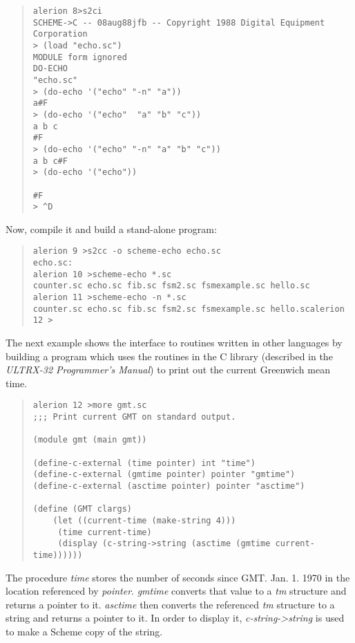 \documentclass[11pt]{article}
\begin{document}
\begin{small}
\begin{quote}
\begin{verbatim}
alerion 8>s2ci
SCHEME->C -- 08aug88jfb -- Copyright 1988 Digital Equipment Corporation
> (load "echo.sc")
MODULE form ignored
DO-ECHO
"echo.sc"
> (do-echo '("echo" "-n" "a"))
a#F
> (do-echo '("echo"  "a" "b" "c"))
a b c
#F
> (do-echo '("echo" "-n" "a" "b" "c"))
a b c#F
> (do-echo '("echo"))

#F
> ^D
\end{verbatim}
\end{quote}
\end{small}

Now, compile it and build a stand-alone program:

\begin{small}
\begin{quote}
\begin{verbatim}
alerion 9 >s2cc -o scheme-echo echo.sc
echo.sc:
alerion 10 >scheme-echo *.sc
counter.sc echo.sc fib.sc fsm2.sc fsmexample.sc hello.sc
alerion 11 >scheme-echo -n *.sc
counter.sc echo.sc fib.sc fsm2.sc fsmexample.sc hello.scalerion 12 >
\end{verbatim}
\end{quote}
\end{small}

The next example shows the interface to routines written in other
languages by building a program which uses the routines in the C library 
(described in the \emph{ULTRX-32 Programmer's Manual}) to print out the
current Greenwich mean time.

\begin{small}
\begin{quote}
\begin{verbatim}
alerion 12 >more gmt.sc
;;; Print current GMT on standard output.

(module gmt (main gmt))

(define-c-external (time pointer) int "time")
(define-c-external (gmtime pointer) pointer "gmtime")
(define-c-external (asctime pointer) pointer "asctime")

(define (GMT clargs)
    (let ((current-time (make-string 4)))
	 (time current-time)
	 (display (c-string->string (asctime (gmtime current-time))))))
\end{verbatim}
\end{quote}
\end{small}

The procedure \emph{time} stores the number of seconds since GMT. Jan.
1. 1970 in the location referenced by \emph{pointer}. \emph{gmtime}
converts that value to a \emph{tm} structure and returns a pointer to
it. \emph{asctime} then converts the referenced \emph{tm} structure to a
string and returns a pointer to it.  In order to display it,
\emph{c-string->string} is used to make a Scheme copy of the string.
\end{document}

